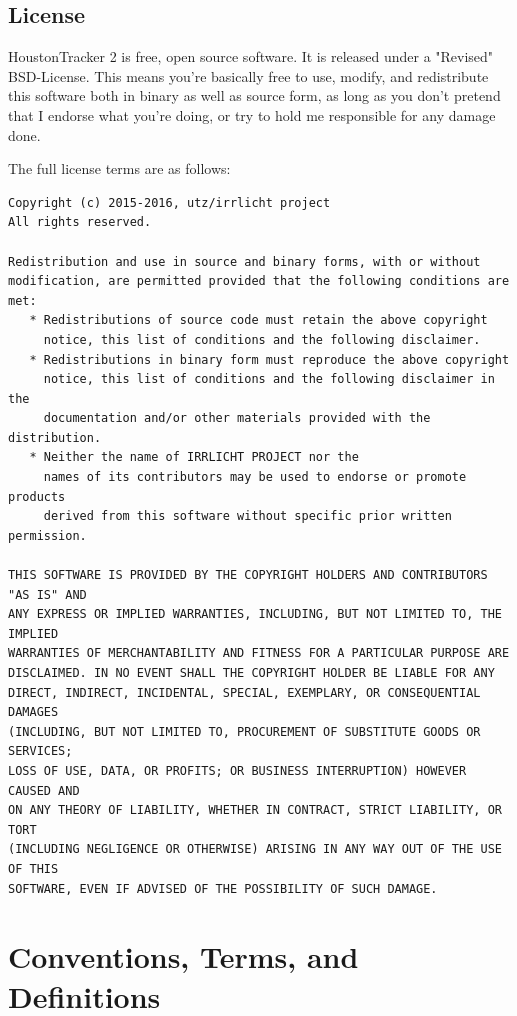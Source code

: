 \documentclass[12pt]{report}	%
\begin{document}
\section{License}
HoustonTracker 2 is free, open source software. It is released under a "Revised" BSD-License. This means you're basically free to use, modify, and redistribute this software both in binary as well as source form, as long as you don't pretend that I endorse what you're doing, or try to hold me responsible for any damage done.

The full license terms are as follows: \newline

{\scriptsize
\begin{verbatim}
Copyright (c) 2015-2016, utz/irrlicht project
All rights reserved.

Redistribution and use in source and binary forms, with or without
modification, are permitted provided that the following conditions are met:
   * Redistributions of source code must retain the above copyright
     notice, this list of conditions and the following disclaimer.
   * Redistributions in binary form must reproduce the above copyright
     notice, this list of conditions and the following disclaimer in the
     documentation and/or other materials provided with the distribution.
   * Neither the name of IRRLICHT PROJECT nor the
     names of its contributors may be used to endorse or promote products
     derived from this software without specific prior written permission.

THIS SOFTWARE IS PROVIDED BY THE COPYRIGHT HOLDERS AND CONTRIBUTORS "AS IS" AND
ANY EXPRESS OR IMPLIED WARRANTIES, INCLUDING, BUT NOT LIMITED TO, THE IMPLIED
WARRANTIES OF MERCHANTABILITY AND FITNESS FOR A PARTICULAR PURPOSE ARE
DISCLAIMED. IN NO EVENT SHALL THE COPYRIGHT HOLDER BE LIABLE FOR ANY
DIRECT, INDIRECT, INCIDENTAL, SPECIAL, EXEMPLARY, OR CONSEQUENTIAL DAMAGES
(INCLUDING, BUT NOT LIMITED TO, PROCUREMENT OF SUBSTITUTE GOODS OR SERVICES;
LOSS OF USE, DATA, OR PROFITS; OR BUSINESS INTERRUPTION) HOWEVER CAUSED AND
ON ANY THEORY OF LIABILITY, WHETHER IN CONTRACT, STRICT LIABILITY, OR TORT
(INCLUDING NEGLIGENCE OR OTHERWISE) ARISING IN ANY WAY OUT OF THE USE OF THIS
SOFTWARE, EVEN IF ADVISED OF THE POSSIBILITY OF SUCH DAMAGE. 
\end{verbatim}
}



\chapter{Conventions, Terms, and Definitions}
\end{document}
